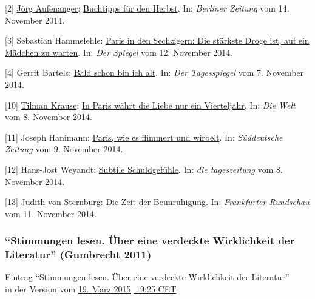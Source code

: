 \documentclass[fontsize=12pt]{scrartcl}
\begin{document}
{\tiny[2] \href{https://de.wikipedia.org/wiki/J\%C3\%B6rg_Aufenanger}{J\"org Aufenanger}: \href{http://www.berliner-zeitung.de/magazin/patrick-modiano-roman--graeser-der-nacht--buchtipps-fuer-den-herbst,10809156,29041850.html}{Buchtipps f\"ur den Herbst}. In: \textit{Berliner Zeitung} vom 14. November 2014.\par}
{\tiny[3] Sebastian Hammelehle: \href{http://www.spiegel.de/kultur/literatur/patrick-modiano-graeser-der-nacht-neuer-roman-des-nobelpreis-traegers-a-1002172.html}{Paris in den Sechzigern: Die st\"arkste Droge ist, auf ein M\"adchen zu warten}. In: \textit{Der Spiegel} vom 12. November 2014.\par}
{\tiny[4] Gerrit Bartels: \href{http://www.tagesspiegel.de/kultur/roman-graeser-der-nacht-von-patrick-modiano-bald-schon-bin-ich-alt/10944754.html}{Bald schon bin ich alt}. In: \textit{Der Tagesspiegel} vom 7. November 2014.\par}
{\tiny[10] \href{https://de.wikipedia.org/wiki/Tilman_Krause}{Tilman Krause}: \href{http://www.welt.de/kultur/literarischewelt/article134135284/In-Paris-waehrt-die-Liebe-nur-ein-Vierteljahr.html}{In Paris w\"ahrt die Liebe nur ein Vierteljahr}. In: \textit{Die Welt} vom 8. November 2014.\par}
{\tiny[11] Joseph Hanimann: \href{http://www.sueddeutsche.de/kultur/neuer-roman-von-patrick-modiano-paris-wie-es-flimmert-und-wirbelt-1.2209555}{Paris, wie es flimmert und wirbelt}. In: \textit{S\"uddeutsche Zeitung} vom 9. November 2014.\par}
{\tiny[12] Hans-Jost Weyandt: \href{http://www.taz.de/1/archiv/digitaz/artikel/?ressort=ku\&dig=2014/11/08/a0032\&cHash=d4db2f45eddbe2484f5ecdbbacc3c469}{Subtile Schuldgef\"uhle}. In: \textit{die tageszeitung} vom 8. November 2014.\par}
{\tiny[13] Judith von Sternburg: \href{http://www.fr-online.de/literatur/patrick-modiano--graeser-der-nacht--die-zeit-der-beunruhigung,1472266,29017966.html}{Die Zeit der Beunruhigung}. In: \textit{Frankfurter Rundschau} vom 11. November 2014.\par}

\subsubsection{"`Stimmungen lesen. \"Uber eine verdeckte Wirklichkeit der Literatur"' (Gumbrecht 2011)}
\label{subsubsec:6.1.12}

Eintrag "`Stimmungen lesen. \"Uber eine verdeckte Wirklichkeit der Li\-te\-ra\-tur"'\\ in der Version vom \href{https://de.wikipedia.org/w/index.php?title=Stimmungen_lesen._\%C3\%9Cber_eine_verdeckte_Wirklichkeit_der_Literatur\&oldid=139943406}{19. M\"arz 2015, 19:25 CET}
\end{document}
